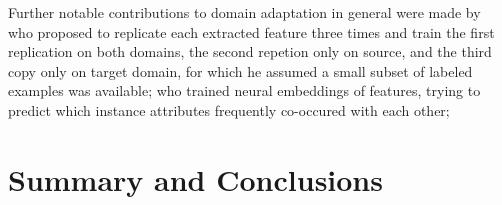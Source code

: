 Further notable contributions to domain adaptation in general were
made by~\citet{Daume:07} who proposed to replicate each extracted
feature three times and train the first replication on both domains,
the second repetion only on source, and the third copy only on target
domain, for which he assumed a small subset of labeled examples was
available; \citet{Yang:15} who trained neural embeddings of features,
trying to predict which instance attributes frequently co-occured with
each other;

\citet{Ganchev:10}


\section{Summary and Conclusions}\label{slsa:subsec:conclusions}

